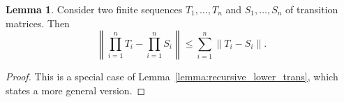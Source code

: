 \documentclass[10pt,a4paper]{paper}
\theoremstyle{definition}
\newtheorem{lemma}[theorem]{Lemma}
\newcommand{\norm}[1]{\left\lVert #1 \right\rVert}
\begin{document}
\begin{lemma}\label{lemma:recursive}
Consider two finite sequences $T_1,\ldots,T_n$ and $S_1,\ldots,S_n$ of transition matrices. Then
\begin{equation*}
\norm{\prod_{i=1}^nT_i - \prod_{i=1}^nS_i} \leq \sum_{i=1}^n \norm{T_i - S_i}.
\end{equation*}
\end{lemma}
\begin{proof}
This is a special case of Lemma~\ref{lemma:recursive_lower_trans}, which states a more general version.
\end{proof}
\end{document}
